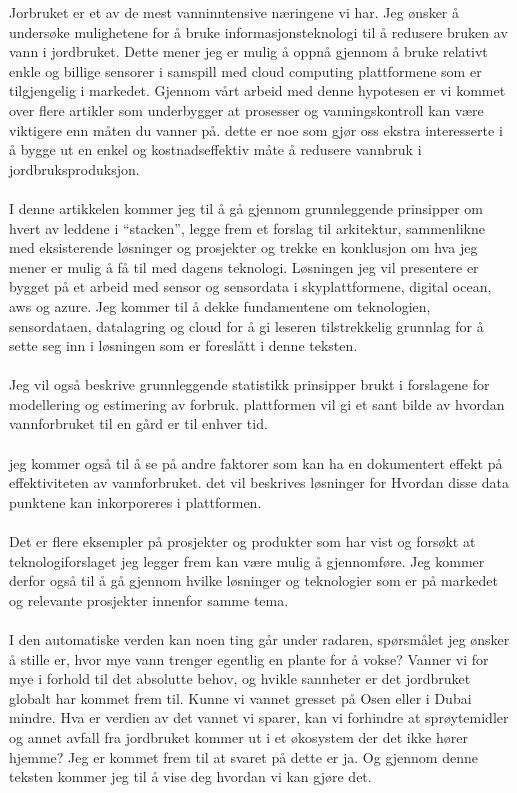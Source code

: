 \documentclass[]{uiophd}
\begin{document}
Jorbruket er et av de mest vanninntensive næringene vi har. Jeg ønsker å undersøke mulighetene for å bruke informasjonsteknologi til å redusere bruken av vann i jordbruket. Dette mener jeg er mulig å oppnå gjennom å bruke relativt enkle og billige sensorer i samspill  med cloud computing plattformene som er tilgjengelig i markedet. Gjennom vårt arbeid med denne hypotesen er vi kommet over flere artikler som underbygger at prosesser og vanningskontroll kan være viktigere enn måten du vanner på.  dette er noe som gjør oss ekstra interesserte i å bygge ut en enkel og kostnadseffektiv måte å redusere vannbruk i jordbruksproduksjon.
\\\\
I denne artikkelen kommer jeg til å gå gjennom grunnleggende prinsipper om hvert av leddene i “stacken”, legge frem et forslag til arkitektur, sammenlikne med eksisterende løsninger og prosjekter og trekke en konklusjon om hva jeg mener er mulig å få til med dagens teknologi. Løsningen jeg vil presentere er bygget på et arbeid med sensor og sensordata i skyplattformene, digital ocean, aws og azure. Jeg kommer til å dekke fundamentene om teknologien, sensordataen, datalagring og cloud for å gi leseren tilstrekkelig grunnlag for å sette seg inn i løsningen som er foreslått i denne teksten.
\\\\
 Jeg vil også beskrive grunnleggende statistikk prinsipper brukt i forslagene for modellering og estimering av forbruk.  plattformen vil gi et sant bilde av hvordan vannforbruket til en gård er til enhver tid.
\\\\
 jeg kommer også til å se på andre faktorer som kan ha en dokumentert effekt på effektiviteten av vannforbruket.  det vil beskrives løsninger for Hvordan disse data punktene kan inkorporeres i plattformen.
\\\\
Det er flere eksempler på prosjekter og produkter som har vist og forsøkt at teknologiforslaget jeg legger frem kan være mulig å gjennomføre. Jeg kommer derfor også til å gå gjennom hvilke løsninger og teknologier som er på markedet og relevante prosjekter innenfor samme tema.
\\\\
I den automatiske verden kan noen ting går under radaren, spørsmålet jeg ønsker å stille er, hvor mye vann trenger egentlig en plante for å vokse? Vanner vi for mye i forhold til det absolutte behov, og hvikle sannheter er det jordbruket globalt har kommet frem til. Kunne vi vannet gresset på Osen eller i Dubai mindre. Hva er verdien av det vannet vi sparer, kan vi forhindre at sprøytemidler og annet avfall fra jordbruket kommer ut i et økosystem der det ikke hører hjemme? Jeg er kommet frem til at svaret på dette er ja. Og gjennom denne teksten kommer jeg til å vise deg hvordan vi kan gjøre det. 
\end{document}
